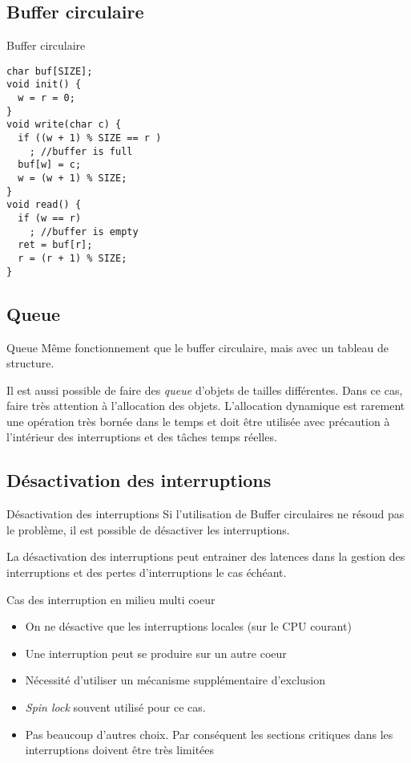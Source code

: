 \subsection{Buffer circulaire}

\begin{frame}[fragile]{Buffer circulaire}
  \begin{lstlisting}
char buf[SIZE]; 
void init() {
  w = r = 0;
}
void write(char c) {
  if ((w + 1) % SIZE == r )
    ; //buffer is full
  buf[w] = c;
  w = (w + 1) % SIZE;
}
void read() {
  if (w == r)
    ; //buffer is empty
  ret = buf[r];
  r = (r + 1) % SIZE;
}
  \end{lstlisting} 
\end{frame} 

\subsection{Queue}

\begin{frame}{Queue}
  Même fonctionnement  que le buffer circulaire, mais  avec un tableau
  de structure.  

  Il est aussi possible de  faire des \emph{queue} d'objets de tailles
  différentes.  Dans  ce cas, faire très attention  à l'allocation des
  objets.   L'allocation  dynamique est  rarement  une opération  très
  bornée  dans  le temps  et  doit  être  utilisée avec  précaution  à
  l'intérieur des interruptions et des tâches temps réelles.
\end{frame} 

\subsection{Désactivation des interruptions}

\begin{frame}{Désactivation des interruptions}
  Si l'utilisation de Buffer circulaires ne résoud pas le problème, il
  est possible de désactiver les interruptions.

  La désactivation des interruptions peut entrainer des latences dans la
  gestion  des  interruptions  et  des  pertes  d'interruptions  le  cas
  échéant.
\end{frame}

\begin{frame}{Cas des interruption en milieu multi coeur}
  \begin{itemize} 
  \item  On ne  désactive que  les interruptions  locales (sur  le CPU
    courant)
  \item Une interruption peut se produire sur un autre coeur
  \item Nécessité d'utiliser un mécanisme supplémentaire d'exclusion
  \item \emph{Spin lock} souvent utilisé pour ce cas.
  \item  Pas beaucoup  d'autres  choix.  Par  conséquent les  sections
    critiques dans les interruptions doivent être très limitées
  \end{itemize} 
\end{frame} 

